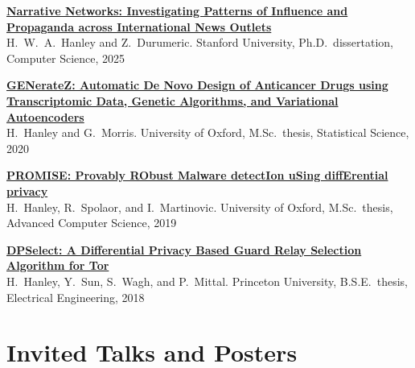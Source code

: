 \documentclass[11pt,letterpaper]{article}
\begin{document}
\begin{plain}
\item \href{https://www.proquest.com/openview/bde2e3a43eef0ea195b100d30649bb43/1?pq-origsite=gscholar\&cbl=18750\&diss=y}{\textbf{Narrative Networks: Investigating Patterns of Influence and Propaganda across International News Outlets}}\\
{\small\color{inksoft}H.~W.~A.~Hanley and Z.~Durumeric. Stanford University, Ph.D.\ dissertation, Computer Science, 2025}

\item \href{https://www.hanshanley.com/files/generatez_dissertation.pdf}{\textbf{GENerateZ: Automatic De Novo Design of Anticancer Drugs using Transcriptomic Data, Genetic Algorithms, and Variational Autoencoders}}\\
{\small\color{inksoft}H.~Hanley and G.~Morris. University of Oxford, M.Sc.\ thesis, Statistical Science, 2020}

\item \href{https://www.hanshanley.com/files/dpnetwork.pdf}{\textbf{PROMISE: Provably RObust Malware detectIon uSing diffErential privacy}}\\
{\small\color{inksoft}H.~Hanley, R.~Spolaor, and I.~Martinovic. University of Oxford, M.Sc.\ thesis, Advanced Computer Science, 2019}

\item \href{https://www.hanshanley.com/files/DPSelect.pdf}{\textbf{DPSelect: A Differential Privacy Based Guard Relay Selection Algorithm for Tor}}\\
{\small\color{inksoft}H.~Hanley, Y.~Sun, S.~Wagh, and P.~Mittal. Princeton University, B.S.E.\ thesis, Electrical Engineering, 2018}
\end{plain}

\section{Invited Talks and Posters}
\end{document}
